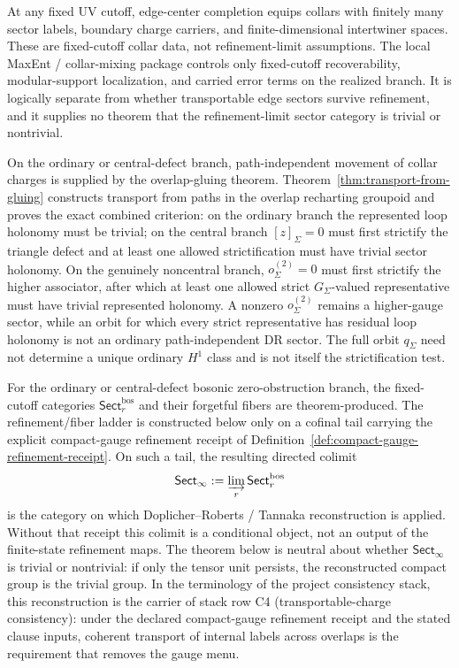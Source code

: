 \documentclass[11pt]{article}
\begin{document}
At any fixed UV cutoff, edge-center completion equips collars with finitely many sector labels, boundary charge carriers, and finite-dimensional intertwiner spaces. These are fixed-cutoff collar data, not refinement-limit assumptions. The local MaxEnt / collar-mixing package controls only fixed-cutoff recoverability, modular-support localization, and carried error terms on the realized branch. It is logically separate from whether transportable edge sectors survive refinement, and it supplies no theorem that the refinement-limit sector category is trivial or nontrivial.

On the ordinary or central-defect branch, path-independent movement of collar charges is supplied by the overlap-gluing theorem. Theorem~\ref{thm:transport-from-gluing} constructs transport from paths in the overlap recharting groupoid and proves the exact combined criterion: on the ordinary branch the represented loop holonomy must be trivial; on the central branch \([z]_\Sigma=0\) must first strictify the triangle defect and at least one allowed strictification must have trivial sector holonomy. On the genuinely noncentral branch, \(o^{(2)}_\Sigma=0\) must first strictify the higher associator, after which at least one allowed strict \(G_\Sigma\)-valued representative must have trivial represented holonomy. A nonzero \(o^{(2)}_\Sigma\) remains a higher-gauge sector, while an orbit for which every strict representative has residual loop holonomy is not an ordinary path-independent DR sector. The full orbit \(q_\Sigma\) need not determine a unique ordinary \(H^1\) class and is not itself the strictification test.

For the ordinary or central-defect bosonic zero-obstruction branch, the fixed-cutoff categories
\(\mathsf{Sect}^{\mathrm{bos}}_r\) and their forgetful fibers are theorem-produced. The
refinement/fiber ladder is constructed below only on a cofinal tail carrying the explicit
compact-gauge refinement receipt of Definition~\ref{def:compact-gauge-refinement-receipt}. On
such a tail, the resulting directed colimit
\[
\mathsf{Sect}_\infty := \varinjlim_r \mathsf{Sect}^{\mathrm{bos}}_r
\]
is the category on which Doplicher--Roberts / Tannaka reconstruction is applied. Without that
receipt this colimit is a conditional object, not an output of the finite-state refinement maps.
The theorem below is neutral about whether \(\mathsf{Sect}_\infty\) is trivial or nontrivial: if
only the tensor unit persists, the reconstructed compact group is the trivial group.
In the terminology of the project consistency stack, this reconstruction is the carrier of stack
row C4 (transportable-charge consistency): under the declared compact-gauge refinement receipt
and the stated clause inputs, coherent transport of internal labels across overlaps is the
requirement that removes the gauge menu.
\end{document}
